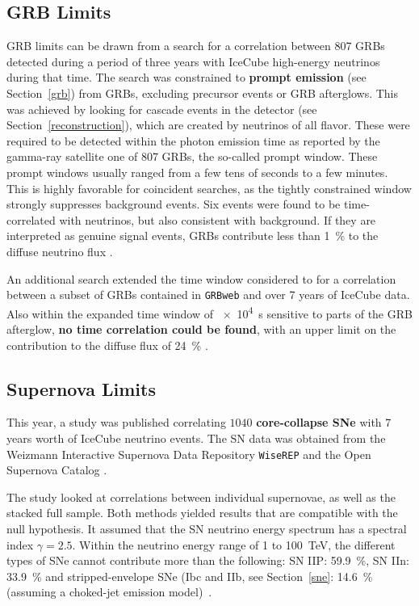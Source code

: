 \subsection{GRB Limits}
GRB limits can be drawn from a search for a correlation between 807 GRBs detected during a period of three years with IceCube high-energy neutrinos during that time. The search was constrained to \textbf{prompt emission} (see Section~\ref{grb}) from GRBs, excluding precursor events or GRB afterglows. This was achieved by looking for cascade events in the detector (see Section~\ref{reconstruction}), which are created by neutrinos of all flavor. These were required to be detected within the photon emission time as reported by the gamma-ray satellite one of 807 GRBs, the so-called prompt window. These prompt windows usually ranged from a few tens of seconds to a few minutes. This is highly favorable for coincident searches, as the tightly constrained window strongly suppresses background events. Six events were found to be time-correlated with neutrinos, but also consistent with background. If they are interpreted as genuine signal events, GRBs contribute less than \SI{1}{\percent} to the diffuse neutrino flux .

An additional search extended the time window considered to  for a correlation between a subset of GRBs contained in \texttt{GRBweb} and over 7 years of IceCube data. Also within the expanded time window of \SI{e4}{s} sensitive to parts of the GRB afterglow, \textbf{no time correlation could be found}, with an upper limit on the contribution to the diffuse flux of \SI{24}{\percent} .

\subsection{Supernova Limits}
This year, a study  was published correlating $1040$ \textbf{core-collapse SNe} with 7 years worth of IceCube neutrino events. The SN data was obtained from the Weizmann Interactive Supernova Data Repository \texttt{WiseREP}  and the Open Supernova Catalog .

The study looked at correlations between individual supernovae, as well as the stacked full sample. Both methods yielded results that are compatible with the null hypothesis. It assumed that the SN neutrino energy spectrum has a spectral index $\gamma=2.5$. Within the neutrino energy range of 1 to \SI{100}{\tera\eV}, the different types of SNe cannot contribute more than the following: SN IIP: \SI{59.9}{\percent}, SN IIn: \SI{33.9}{\percent} and stripped-envelope SNe (Ibc and IIb, see Section~\ref{sne}: \SI{14.6}{\percent} (assuming a choked-jet emission model)~\cite{Necker2023}.

